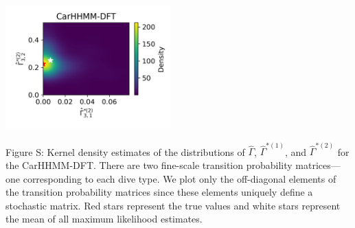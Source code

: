 \documentclass{article}
\begin{document}
\begin{center}
        \includegraphics[width=2.5in]{../Plots/hhmm_FV_Gamma_density_1_row_2.png}
        \end{center}
        
        \noindent Figure S: Kernel density estimates of the distributions of $\hat \Gamma$, $\hat \Gamma^{*(1)}$, and $\hat \Gamma^{*(2)}$ for the CarHHMM-DFT. There are two fine-scale transition probability matrices---one corresponding to each dive type. We plot only the off-diagonal elements of the transition probability matrices since these elements uniquely define a stochastic matrix. Red stars represent the true values and white stars represent the mean of all maximum likelihood estimates.
        \addtocounter{fignum}{1}
        
        \newpage
\end{document}
